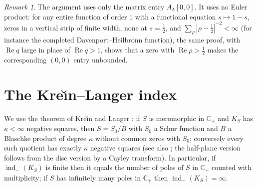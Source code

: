 \documentclass[11pt]{amsart}
\theoremstyle{definition}
\theoremstyle{remark}
\newtheorem{remark}[theorem]{Remark}
\renewcommand{\Re}{\operatorname{Re}}
\newcommand{\half}{\tfrac{1}{2}}
\newcommand{\C}{\mathbb{C}}
\newcommand{\indm}{\operatorname{ind}_-}
\begin{document}
\begin{remark}
The argument uses only the matrix entry $A_\lambda[0,0]$.
It uses no Euler product: for any entire function of order $1$ with a functional equation
$s\mapsto1-s$, zeros in a vertical strip of finite width, none at $s=\half$, and
$\sum_\rho|\rho-\half|^{-2}<\infty$ (for instance the completed Davenport--Heilbronn function), the
same proof, with $\Re q$ large in place of $\Re q>1$, shows that a zero with $\Re\rho>\half$ makes the
corresponding $(0,0)$ entry unbounded.
\end{remark}

\section{The Kre\u\i n--Langer index}
We use the theorem of Kre\u\i n and Langer \cite{KL72}: if $S$ is meromorphic in $\C_+$ and $K_S$
has $\kappa<\infty$ negative squares, then $S=S_0/B$ with $S_0$ a Schur function and $B$ a
Blaschke product of degree $\kappa$ without common zeros with $S_0$; conversely every such quotient
has exactly $\kappa$ negative squares (see also \cite{ADRS}; the half-plane version follows from
the disc version by a Cayley transform). In particular, if $\indm(K_S)$ is finite then it equals the
number of poles of $S$ in $\C_+$ counted with multiplicity; if $S$ has infinitely many poles in
$\C_+$ then $\indm(K_S)=\infty$.
\end{document}
